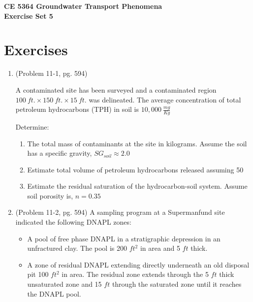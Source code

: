 \documentclass[12pt]{article}
\begin{document}
\begin{center}
{\textbf{{ CE 5364 Groundwater Transport Phenomena } \\ {Exercise Set 5}}}
\end{center}

\section*{\small{Exercises}}
\begin{enumerate} %


\item (Problem 11-1, pg. 594)

A contaminated site has been surveyed and a contaminated region $100~ft. \times 150~ft. \times 15~ft.$ was delineated. The average concentration of total petroleum hydrocarbons (TPH) in soil is $10,000~\frac{mg}{Kg}$

Determine:

\begin{enumerate} %
\item The total mass of contaminants at the site in kilograms. Assume the soil has a specific gravity, $SG _{soil} \approx 2.0$
\item Estimate total volume of petroleum hydrocarbons released assuming 50%
\item Estimate the residual saturation of the hydrocarbon-soil system.  Assume soil porosity is, $n=0.35$
\end{enumerate} %



\clearpage

\item (Problem 11-2, pg. 594)
A sampling program at a Supermanfund site indicated the following DNAPL zones:
\begin{itemize}
\item A pool of free phase DNAPL in a stratigraphic depression in an unfractured clay. The pool is 200 $ft^2$ in area and 5 $ft$ thick.
\item A zone of residual DNAPL extending directly underneath an old disposal pit 100 $ft^2$ in area.  The residual zone extends through the 5 $ft$ thick unsaturated zone and 15 $ft$ through the saturated zone until it reaches the DNAPL pool.
\end{itemize}


\end{enumerate}
\end{document}
